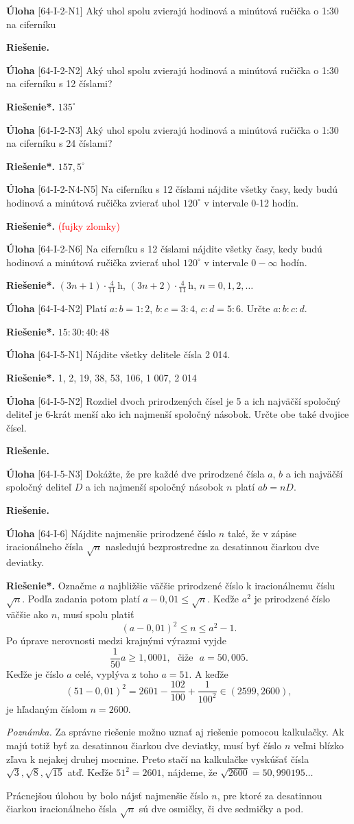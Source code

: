 \documentclass{article}
\newcommand{\rie}{\textbf{Riešenie.} }
\newcommand{\rieh}{\textbf{Riešenie*.} }
\newcommand\todo[1]{\noindent\textcolor{red}{(#1)}}
\newcommand{\problem}[3]{
  \begin{tcolorbox}[breakable,notitle,boxrule=0pt,colback=light-gray,colframe=light-gray]
    \textbf{Úloha}
    [#1] #2
  \end{tcolorbox}
  \noindent#3
}
\begin{document}
\problem{64-I-2-N1}{
Aký uhol spolu zvierajú hodinová a minútová ručička o 1:30 na ciferníku
}{
\rie 
}

\problem{64-I-2-N2}{
Aký uhol spolu zvierajú hodinová a minútová ručička o 1:30 na ciferníku s 12 číslami?
}{
\rieh $135^{\circ}$
}

\problem{64-I-2-N3}{
Aký uhol spolu zvierajú hodinová a minútová ručička o 1:30 na ciferníku s 24 číslami? 
}{
\rieh $157,5^{\circ}$
}


\problem{64-I-2-N4-N5}{
Na ciferníku s 12 číslami nájdite všetky časy, kedy budú hodinová a minútová ručička zvierať uhol $120^{\circ}$ v intervale 0-12 hodín.
}{
\rieh \todo{fujky zlomky}
}

\problem{64-I-2-N6}{
Na ciferníku s 12 číslami nájdite všetky časy, kedy budú hodinová a minútová ručička zvierať uhol $120^{\circ}$ v intervale $0-\infty$ hodín.
}{
\rieh $(3n+1) \cdot \frac{4}{11}$\,h, $(3n+2)\cdot\frac{4}{11}$\,h, $n=0, 1, 2, \ldots$
}


\problem{64-I-4-N2}{
 Platí $a : b = 1 : 2$, $b : c = 3 : 4$, $c : d = 5 : 6$. Určte $a : b : c : d$.
 }{
 \rieh $15 : 30 : 40 : 48$
 }


\problem{64-I-5-N1}{
Nájdite všetky delitele čísla 2 014. 
}{
\rieh 1, 2, 19, 38, 53, 106, 1 007, 2 014
}

\problem{64-I-5-N2}{
Rozdiel dvoch prirodzených čísel je 5 a ich najväčší spoločný deliteľ je 6-krát menší ako ich najmenší spoločný násobok. Určte obe také dvojice čísel.
}{
\rie 
}


\problem{64-I-5-N3}{
Dokážte, že pre každé dve prirodzené čísla $a$, $b$ a ich najväčší spoločný deliteľ $D$ a ich najmenší spoločný násobok $n$ platí $ab = nD$.
}{
\rie
}


\problem{64-I-6}{
Nájdite najmenšie prirodzené číslo $n$ také, že v zápise iracionálneho čísla $\sqrt{n}$ nasledujú bezprostredne za desatinnou čiarkou dve deviatky.
}{
\rieh Označme $a$ najbližšie väčšie prirodzené číslo k iracionálnemu číslu $\sqrt{n}$. Podľa zadania potom platí $a - 0,01 \leq \sqrt{n}$. Keďže $a^2$ je prirodzené číslo väčšie ako $n$, musí spolu platiť
$$(a - 0,01)^2 \leq n \leq  a^2 - 1.$$
Po úprave nerovnosti medzi krajnými výrazmi vyjde
$$\frac{1}{50}a \geq 1,000 1, \ \ \ \text{čiže} \ \ \  a = 50,005.$$
Keďže je číslo $a$ celé, vyplýva z toho $a = 51$. A keďže
$$(51 - 0,01)^2= 2 601 - \frac{102}{100}+\frac{1}{100^2}\in (2 599, 2 600),$$
je hľadaným číslom $n = 2 600$.

\textit{Poznámka.} Za správne riešenie možno uznať aj riešenie pomocou kalkulačky. Ak majú totiž byť za desatinnou čiarkou dve deviatky, musí byť číslo $n$ veľmi blízko zľava k nejakej druhej mocnine. Preto stačí na kalkulačke vyskúšať čísla $\sqrt{3}, \sqrt{8}, \sqrt{15}$ atď. Keďže $51^2= 2 601$, nájdeme, že $\sqrt{2 600} = 50,990 195\ldots$

Prácnejšou úlohou by bolo nájsť najmenšie číslo $n$, pre ktoré za desatinnou čiarkou iracionálneho čísla $\sqrt{n}$ sú dve osmičky, či dve sedmičky a pod.
}
\end{document}
